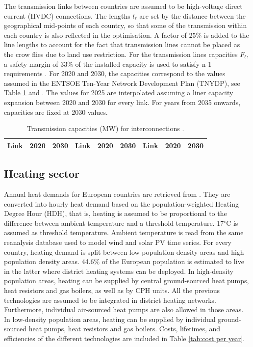 \documentclass[3p]{elsarticle} %
\begin{document}
The transmission links between countries are assumed to be high-voltage direct current (HVDC) connections. The lengths $l_{\ell}$ are set by the distance between the geographical mid-points of each country, so that some of the transmission within each country is also reflected in the optimisation. A factor of 25\% is added to the line lengths to account for the fact that transmission lines cannot be placed as the crow flies due to land use restriction. For the transmission lines capacities $F_{\ell}$, a safety margin of 33\% of the installed capacity is used to satisfy n-1 requirements \cite{Brown_2016}. For 2020 and 2030, the capacities correspond to the values assumed in the ENTSOE Ten-Year Network Development Plan (TNYDP), see Table \ref{tab_interconnections} and \cite{TYNDP2016}. The values for 2025 are interpolated assuming a liner capacity expansion between 2020 and 2030 for every link. For years from 2035 onwards, capacities are fixed at 2030 values. \


\begin{table}[!b]
\footnotesize
\centering
\begin{threeparttable}
\caption{Transmission capacities (MW) for interconnections \cite{TYNDP2016}.} \label{tab_interconnections}
\centering

\begin{tabularx}{10.5cm}{|lrr|lrr|lrr|}
\toprule
Link & 2020 & 2030 & Link & 2020 & 2030 & Link & 2020 & 2030  \\
\midrule

\bottomrule
\end{tabularx}
\end{threeparttable}
\end{table}


\subsection{Heating sector}

Annual heat demands for European countries are retrieved from \cite{HRE}. They are converted into hourly heat demand based on the population-weighted \cite{NUTS3} Heating Degree Hour (HDH), that is, heating is assumed to be proportional to the difference between ambient temperature and a threshold temperature. 17$^{\circ}$C is assumed as threshold temperature. Ambient temperature is read from the same reanalysis database \cite{CFSR} used to model wind and solar PV time series. For every country, heating demand is split between low-population density areas and high-population density areas. 44.6\%  of the European population is estimated to live in the latter \cite{Brown_2018} where district heating systems can be deployed. In high-density population areas, heating can be supplied by central ground-sourced heat pumps, heat resistors and gas boilers, as well as by CPH units. All the previous technologies are assumed to be integrated in district heating networks. Furthermore, individual air-sourced heat pumps are also allowed in those areas. In low-density population areas, heating can be supplied by individual ground-sourced heat pumps, heat resistors and gas boilers. Costs, lifetimes, and efficiencies of the different technologies are included in Table \ref{tab:cost per year}. \
\end{document}
